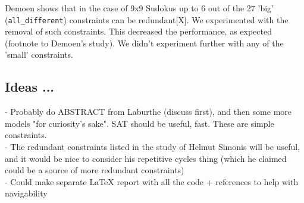 \documentclass{misc/theme}
\begin{document}
Demoen shows that in the case of 9x9 Sudokus up to 6 out of the 27 'big' (\texttt{all\_different}) constraints can be redundant[X]. We experimented with the removal of such constraints. This decreased the performance, as expected (footnote to Demoen's study). We didn't experiment further with any of the 'small' constraints.

\subsection{Ideas ...}

 - Probably do ABSTRACT from Laburthe (discuss first), and then some more models "for curiosity's sake". SAT should be useful, fast. These are simple constraints.\\
 - The redundant constraints listed in the study of Helmut Simonis will be useful, and it would be nice to consider his repetitive cycles thing (which he claimed could be a source of more redundant constraints)\\
 - Could make separate LaTeX report with all the code + references to help with navigability
\end{document}
